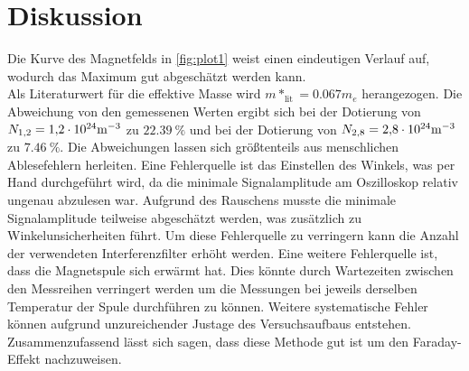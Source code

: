 \section{Diskussion}
\label{sec:Diskussion}
Die Kurve des Magnetfelds in \autoref{fig:plot1} weist einen eindeutigen Verlauf auf, wodurch das Maximum gut abgeschätzt werden kann.\\
Als Literaturwert für die effektive Masse wird $m*_{\text{lit}}= 0.067 m_e$ \cite{effektiveMasseGaAs} herangezogen. Die Abweichung von den gemessenen
Werten ergibt sich bei der Dotierung von $N_{1,2}= \num{1.2 e24} \unit[per-mode=reciprocal]{\per\cubic\meter}$ zu $\qty{22.39}{\percent}$ und bei der Dotierung 
von $N_{2,8}= \num{2.8 e24} \unit[per-mode=reciprocal]{\per\cubic\meter}$zu $\qty{7.46}{\percent}$.
Die Abweichungen lassen sich größtenteils aus menschlichen Ablesefehlern herleiten. 
Eine Fehlerquelle ist das Einstellen des Winkels, was per Hand durchgeführt wird, da die minimale Signalamplitude am Oszilloskop relativ ungenau
abzulesen war. Aufgrund des Rauschens musste die minimale Signalamplitude teilweise abgeschätzt werden, was zusätzlich zu Winkelunsicherheiten 
führt. Um diese Fehlerquelle zu verringern kann die Anzahl der verwendeten Interferenzfilter erhöht werden. Eine weitere Fehlerquelle ist, dass die Magnetspule
sich erwärmt hat. Dies könnte durch Wartezeiten zwischen den Messreihen verringert werden um die Messungen bei jeweils derselben Temperatur
der Spule durchführen zu können.
Weitere systematische Fehler können aufgrund unzureichender Justage des Versuchsaufbaus entstehen.\\
Zusammenzufassend lässt sich sagen, dass diese Methode gut ist um den Faraday-Effekt nachzuweisen.
\newpage

